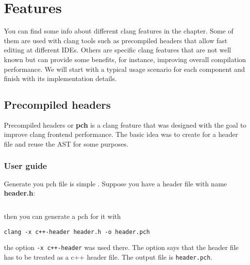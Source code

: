 \chapter{Features}
 You can find some info about different clang features in the chapter. Some of
 them are used with clang tools such as precompiled headers that allow fast
 editing at different IDEs. Others are specific clang features that are not well
 known but can provide some benefits, for instance, improving overall
 compilation performance. We will start with a typical usage scenario for each
 component and finish with its implementation details.
 
\section{Precompiled headers}
Precompiled headers or \textbf{pch} is a clang feature that was
designed with the goal to improve clang frontend performance. The
basic idea was to create  for a header file and reuse the AST for
some purposes.

\subsection{User guide}
Generate you pch file is simple \cite{clang:user_manual}. Suppose you have a header file with
name \textbf{header.h}:
\inputminted{c++}{./src/pch/simple/header.h} then you can generate a pch for it with
\begin{verbatim}
clang -x c++-header header.h -o header.pch
\end{verbatim}
the option \texttt{-x c++-header} was used there. The option says that
the header file has to be treated as a c++ header file. The output
file is \texttt{header.pch}.

